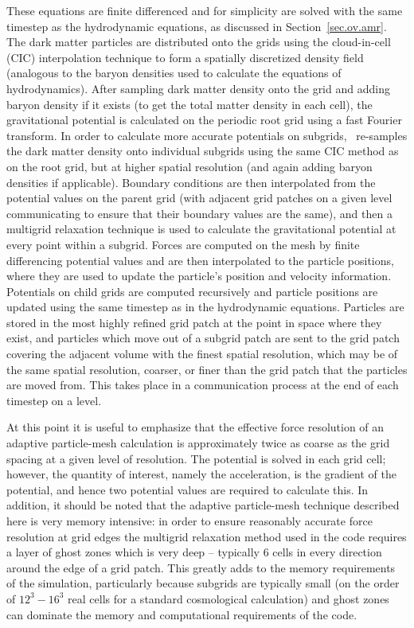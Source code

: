 These equations are finite differenced and for simplicity are solved with the
same timestep as the hydrodynamic equations, as discussed in 
Section~\ref{sec.ov.amr}.
The dark matter particles are distributed onto the grids
using the cloud-in-cell (CIC) interpolation technique to form a spatially
discretized density field (analogous to the baryon densities used to calculate
the equations of hydrodynamics).  After sampling dark matter density onto the
grid and adding baryon density if it exists (to get the total matter density
in each cell), the gravitational potential is calculated on the periodic root
grid using a fast Fourier transform.  In order to calculate more accurate
potentials on subgrids, \enzo\ re-samples the dark matter density onto
individual subgrids using the same CIC method as on the root grid, but at
higher spatial resolution (and again adding baryon densities if applicable).
Boundary conditions are then interpolated from the potential values on the
parent grid (with adjacent grid patches on a given level communicating to
ensure that their boundary values are the same), and then a multigrid
relaxation technique is used to calculate the gravitational potential at every
point within a subgrid.  Forces are computed on the mesh by
finite differencing potential values and are then interpolated to the particle
positions, where they are used to update the particle's position and velocity
information.  Potentials on child grids are computed recursively and particle
positions are updated using the same timestep as in the hydrodynamic
equations.  Particles are stored in the most highly refined grid patch at the
point in space where they exist, and particles which move out of a subgrid
patch are sent to the grid patch covering the adjacent volume with the finest
spatial resolution, which may be of the same spatial resolution, coarser, or finer
than the grid patch that the particles are moved from.  This takes place in a
communication process at the end of each timestep on a level.

At this point it is useful to emphasize that the effective force
resolution of an adaptive particle-mesh calculation is approximately twice
as coarse as the grid spacing at a given level of resolution.  The 
potential is solved in each grid cell;
however, the quantity of interest, namely the acceleration, is the gradient
of the potential, and hence two potential values are required to calculate
this.  In addition, it should be noted that the adaptive particle-mesh
technique described here is very memory intensive: in order to ensure reasonably 
accurate force resolution at grid edges the multigrid relaxation
method used in the code requires a layer of ghost zones which is very deep --
typically 6 cells in every direction around the edge of a grid patch.  This greatly
adds to the memory requirements of the simulation, particularly because subgrids
are typically small (on the order of $12^3 - 16^3$ real cells for a standard 
cosmological calculation) and ghost zones can dominate the memory and computational 
requirements of the code.


